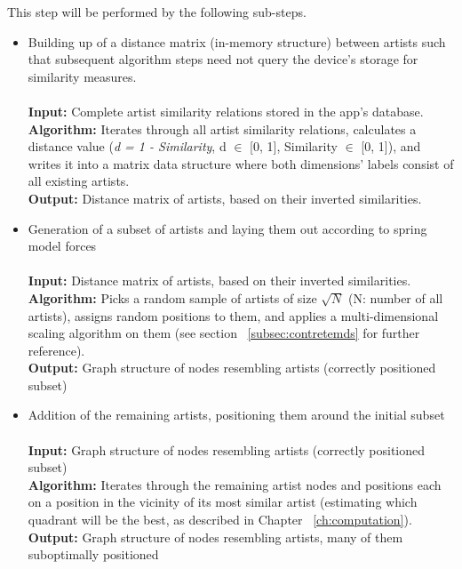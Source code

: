 \begin{itemize}
			This step will be performed by the following sub-steps.

		\begin{itemize}
			
			\item Building up of a distance matrix (in-memory structure) between artists such that subsequent algorithm steps need not query the device's storage for similarity measures. \\\\
				\textbf{Input:} Complete artist similarity relations stored in the app's database. \\
				\textbf{Algorithm:} Iterates through all artist similarity relations, calculates a
				distance value (\emph{d = 1 - Similarity}, d $\in$ [0, 1], Similarity $\in$ [0, 1]), and writes it into
				a matrix data structure where both dimensions' labels consist of all existing artists. \\
				\textbf{Output:} Distance matrix of artists, based on their inverted similarities. \\
				
			\item Generation of a subset of artists and laying them out according to spring model forces	\\\\
				\textbf{Input:} Distance matrix of artists, based on their inverted similarities. \\
				\textbf{Algorithm:} Picks a random sample of artists of size $\sqrt{N}$ (N: number of all artists), assigns random positions to them,
				and applies a multi-dimensional scaling algorithm on them (see section 
				~\ref{subsec:contretemds} for further reference). \\
				\textbf{Output:} Graph structure of nodes resembling artists (correctly positioned subset) \\
				
			\item Addition of the remaining artists, positioning them around the initial subset \\\\
				\textbf{Input:} Graph structure of nodes resembling artists (correctly positioned subset) \\
				\textbf{Algorithm:} Iterates through the remaining artist nodes and positions each on a position
				in the vicinity of its most similar artist (estimating which quadrant will be the best, as described in Chapter ~\ref{ch:computation}). \\
				\textbf{Output:} Graph structure of nodes resembling artists, many of them suboptimally positioned \\
				

\end{itemize}
\end{itemize}
